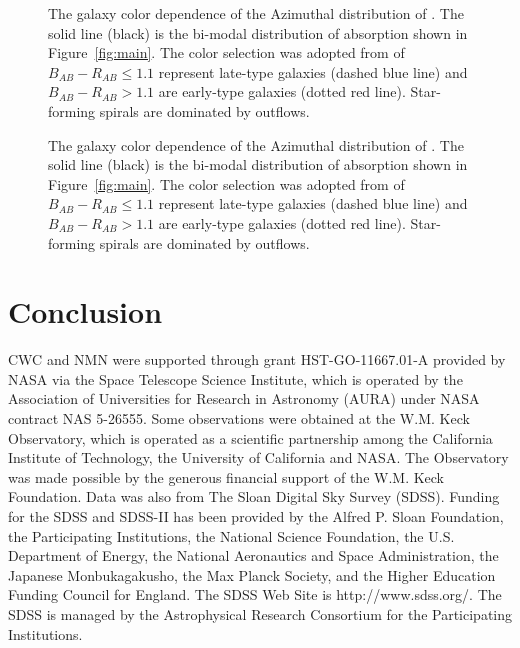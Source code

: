 \documentclass{emulateapj}
\begin{document}
\begin{figure}
\caption[angle=0]{The galaxy color dependence of the Azimuthal
distribution of {\MgII}. The solid line (black) is the bi-modal
distribution of {\MgII} absorption shown in Figure~\ref{fig:main}. The
color selection was adopted from \citet{chen10a} of $B_{AB}-R_{AB}
\leq 1.1$ represent late-type galaxies (dashed blue line) and
$B_{AB}-R_{AB} > 1.1$ are early-type galaxies (dotted red
line). Star-forming spirals are dominated by outflows. }
\label{fig:Phi-masses}
\end{figure}


\begin{figure}
\caption[angle=0]{The galaxy color dependence of the Azimuthal
distribution of {\MgII}. The solid line (black) is the bi-modal
distribution of {\MgII} absorption shown in Figure~\ref{fig:main}. The
color selection was adopted from \citet{chen10a} of $B_{AB}-R_{AB}
\leq 1.1$ represent late-type galaxies (dashed blue line) and
$B_{AB}-R_{AB} > 1.1$ are early-type galaxies (dotted red
line). Star-forming spirals are dominated by outflows. }
\label{fig:Phi-masses}
\end{figure}


\section{Conclusion}

\acknowledgments 

CWC and NMN were supported through grant HST-GO-11667.01-A provided by
NASA via the Space Telescope Science Institute, which is operated by
the Association of Universities for Research in Astronomy (AURA) under
NASA contract NAS 5-26555.  Some observations were obtained at the
W.M. Keck Observatory, which is operated as a scientific partnership
among the California Institute of Technology, the University of
California and NASA.  The Observatory was made possible by the
generous financial support of the W.M. Keck Foundation.  Data was also
from The Sloan Digital Sky Survey (SDSS).  Funding for the SDSS and
SDSS-II has been provided by the Alfred P. Sloan Foundation, the
Participating Institutions, the National Science Foundation, the
U.S. Department of Energy, the National Aeronautics and Space
Administration, the Japanese Monbukagakusho, the Max Planck Society,
and the Higher Education Funding Council for England. The SDSS Web
Site is http://www.sdss.org/. The SDSS is managed by the Astrophysical
Research Consortium for the Participating Institutions.
\end{document}
